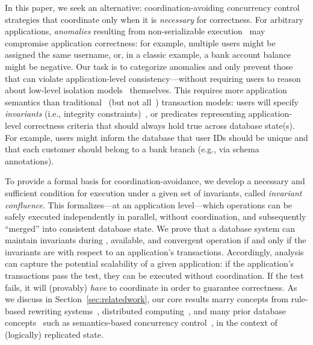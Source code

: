 
In this paper, we seek an alternative: coordination-avoiding
concurrency control strategies that coordinate only when it is
\textit{necessary} for correctness. For arbitrary applications,
\textit{anomalies} resulting from non-serializable
execution~\cite{adya-isolation} may compromise application
correctness: for example, multiple users might be assigned the same
username, or, in a classic example, a bank account balance might be
negative. Our task is to categorize anomalies and only prevent those
that can violate application-level consistency---without requiring
users to reason about low-level isolation models~\cite{hat-vldb}
themselves. This requires more application semantics  than
traditional~\cite{bernstein-book,gray-virtues} (but not
all~\cite{eswaran-consistency,korth-serializability,decomp-semantics,garciamolina-semantics,activedb-book,ic-survey,ic-survey-two})
transaction models: users will specify \textit{invariants} (i.e.,
integrity constraints)~\cite{traiger-tods}, or predicates representing
application-level correctness criteria that should always hold true
across database state(s). For example, users might inform the database
that user IDs should be unique and that each customer should belong to
a bank branch (e.g., via schema annotations).

To provide a formal basis for coordination-avoidance, we develop a
necessary and sufficient condition for \cfree execution under a given
set of invariants, called \textit{invariant confluence}. This
\iconfluence formalizes---at an application level---which operations
can be safely executed independently in parallel, without coordination, and subsequently
``merged'' into consistent database state. We prove that a database
system can maintain invariants during \cfree, available, and
convergent operation if and only if the invariants are \iconfluent
with respect to an application's transactions. Accordingly,
\iconfluence analysis can capture the potential scalability of a given
application: if the application's transactions   pass the \iconfluence test, they can be
executed without coordination. If  the test fails, it
will (provably) \textit{have} to coordinate in order to guarantee
correctness. As we discuss in Section~\ref{sec:relatedwork}, our core
results marry concepts from rule-based rewriting
systems~\cite{obs-confluence,termrewriting}, distributed
computing~\cite{herlihy-apologizing,gilbert-cap,hat-vldb}, and many
prior database concepts~\cite{activedb-book,ic-survey,ic-survey-two}
such as semantics-based concurrency
control~\cite{sdd1,decomp-semantics,badrinath-semantics,garciamolina-semantics,korth-serializability,atomictransactions,weihl-thesis},
in the context of (logically) replicated state.

